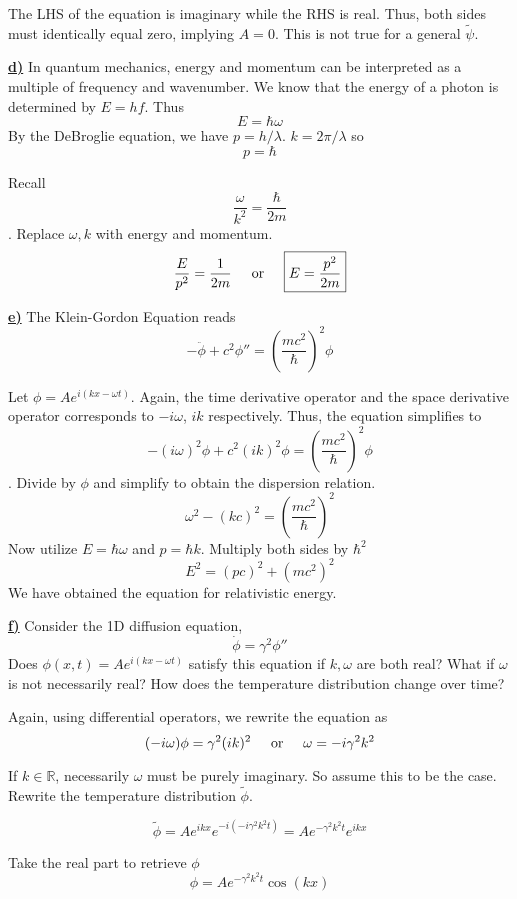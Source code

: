 \documentclass{article}
\newcommand{\new}[1]{
    \vspace{2mm}
    \noindent
    \textbf{
    \underline{#1}}
}
\newcommand{\textOr}{
    {
        \hspace{5mm}
        \textrm{or}
        \hspace{5mm}
    }
}
\newcommand{\Ixp}[1]{
    {
        e^{i{#1}}
    }
}
\begin{document}
The LHS of the equation is imaginary while the RHS is real. 
Thus, both sides must identically equal zero, implying $A = 0$. 
This is not true for a general $\tilde\psi$. \lightning

\new{d)} In quantum mechanics, energy and momentum can be interpreted 
as a multiple of frequency and wavenumber. We know that the 
energy of a photon is determined by $E = hf$. Thus 
\[
    E = \hbar \omega
\]
By the DeBroglie equation, we have $p = h/\lambda$. $k = 2\pi / \lambda$ 
so 
\[
    p = \hbar 
    \] 

Recall 
\[
    \frac \omega {k^2} = \frac \hbar {2m}
\]
. Replace $\omega, k$ with energy and momentum.
\[
    \frac E {p^2} = \frac 1 {2m} 
    \textOr 
    \boxed{
        E = \frac{p^2}{2m}
    }
\]

\new{e)} The Klein-Gordon Equation reads 
\[
    -\ddot\phi + c^2 \phi '' =
    \left(
        \frac {mc^2} \hbar
    \right)^2 
    \phi
\]

Let $\phi = A\Ixp{(kx - \omega t)}$. Again, the 
time derivative operator and the space derivative operator 
corresponds to $-i\omega$, $ik$ respectively. Thus, the equation 
simplifies to 
\[
    -(i\omega)^2 \phi + c^2 (ik)^2 \phi = \left(
        \frac {mc^2} \hbar
    \right)^2 
    \phi
\]. 
Divide by $\phi$ and simplify to obtain the dispersion relation. 
\[
    \omega^2 - (kc)^2 = \left(
        \frac {mc^2} \hbar
    \right)^2 
\]
Now utilize $E = \hbar \omega$ and $p = \hbar k$. Multiply both sides by $\hbar^2 $
\[
    E^2 = (pc)^2 + (mc^2)^2
\]
We have obtained the equation for relativistic energy. 

\new{f)} Consider the 1D diffusion equation, 
\[
    \dot \phi = \gamma^2 \phi ''
\]
Does $\phi(x, t) = A\Ixp{(kx - \omega t)}$ satisfy this equation 
if $k, \omega$ are both real? What if $\omega$ is not necessarily real? 
How does the temperature distribution change over time?

Again, using differential operators, we rewrite the equation as 
\[
   (-i\omega) \phi = \gamma^2 (ik)^2  
   \textOr 
   \omega = -i\gamma^2k^2
\]

If $k\in \mathbb{R}$, necessarily $\omega$ must be purely imaginary. So 
assume this to be the case. Rewrite the temperature distribution $\tilde \phi$. 

\[
    \tilde \phi = A \Ixp{kx} e^{-i(-i\gamma^2k^2t)} = Ae^{-\gamma^2k^2t} e^{ikx} 
\]

Take the real part to retrieve $\phi$
\[
    \phi =  Ae^{-\gamma^2k^2t} \cos(kx)
\]
\end{document}
